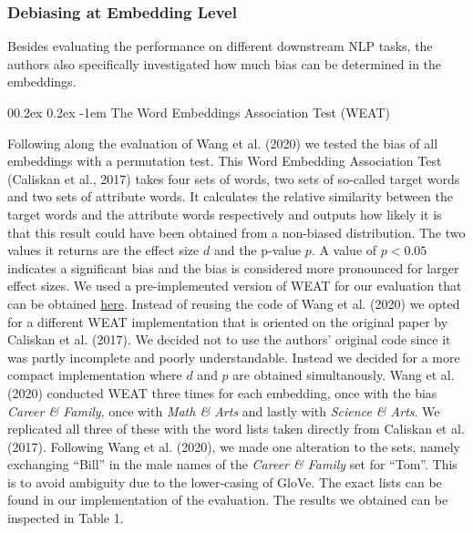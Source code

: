 \documentclass[
  english,
  man,floatsintext]{apa6}
\makeatletter
\let\oldparagraph\paragraph
\renewcommand{\paragraph}[1]{\oldparagraph{#1}\mbox{}}
\renewcommand{\paragraph}{\@startsection{paragraph}{4}{\parindent}%
  {0\baselineskip \@plus 0.2ex \@minus 0.2ex}%
  {-1em}%
  {\normalfont\normalsize\bfseries\itshape\typesectitle}}
\makeatother
\begin{document}
\hypertarget{debiasing-at-embedding-level}{%
\subsubsection{Debiasing at Embedding Level}\label{debiasing-at-embedding-level}}

Besides evaluating the performance on different downstream NLP tasks, the authors also specifically investigated how much bias can be determined in the embeddings.

\hypertarget{the-word-embeddings-association-test-weat}{%
\paragraph{The Word Embeddings Association Test (WEAT)}\label{the-word-embeddings-association-test-weat}}

Following along the evaluation of Wang et al. (2020) we tested the bias of all embeddings with a permutation test. This Word Embedding Association Test (Caliskan et al., 2017) takes four sets of words, two sets of so-called target words and two sets of attribute words. It calculates the relative similarity between the target words and the attribute words respectively and outputs how likely it is that this result could have been obtained from a non-biased distribution. The two values it returns are the effect size \(d\) and the p-value \(p\). A value of \(p<0.05\) indicates a significant bias and the bias is considered more pronounced for larger effect sizes.
We used a pre-implemented version of WEAT for our evaluation that can be obtained \href{https://github.com/shivaomrani/HumanBiasInSemantics}{here}. Instead of reusing the code of Wang et al. (2020) we opted for a different WEAT implementation that is oriented on the original paper by Caliskan et al. (2017). We decided not to use the authors' original code since it was partly incomplete and poorly understandable. Instead we decided for a more compact implementation where \(d\) and \(p\) are obtained simultanously.
Wang et al. (2020) conducted WEAT three times for each embedding, once with the bias \emph{Career \& Family}, once with \emph{Math \& Arts} and lastly with \emph{Science \& Arts}. We replicated all three of these with the word lists taken directly from Caliskan et al. (2017). Following Wang et al. (2020), we made one alteration to the sets, namely exchanging \enquote{Bill} in the male names of the \emph{Career \& Family} set for \enquote{Tom}. This is to avoid ambiguity due to the lower-casing of GloVe. The exact lists can be found in our implementation of the evaluation.
The results we obtained can be inspected in Table 1.
\end{document}
